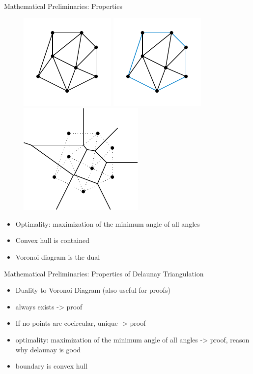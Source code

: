 \documentclass[aspectratio=169]{beamer}
\begin{document}
\begin{frame}{Mathematical Preliminaries: Properties}
  \begin{figure}
    \center
    \includegraphics[scale=1.3]{figures/delaunay-triangulation.pdf}
    \includegraphics[scale=1.3]{figures/delaunay-triangulation-convex-hull.pdf}
    \includegraphics[scale=1.3]{figures/delaunay-triangulation-voronoi.pdf}
  \end{figure}
  \begin{itemize}
    \item Optimality: maximization of the minimum angle of all angles
    \item Convex hull is contained
    \item Voronoi diagram is the dual
  \end{itemize}
\end{frame}

\begin{frame}{Mathematical Preliminaries: Properties of Delaunay Triangulation}
  \begin{itemize}
    \item Duality to Voronoi Diagram (also useful for proofs)
    \item always exists -> proof
    \item If no points are cocircular, unique -> proof
    \item optimality: maximization of the minimum angle of all angles -> proof, reason why delaunay is good
    \item boundary is convex hull
  \end{itemize}
\end{frame}
\end{document}
